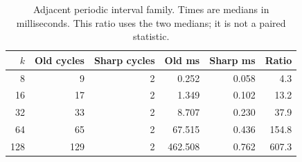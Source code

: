 \begin{table}[htbp]
\centering\small
\setlength{\tabcolsep}{4pt}
\begin{tabular}{@{}rrrrrr@{}}
\toprule
$k$ & Old cycles & Sharp cycles & Old ms & Sharp ms & Ratio\\\midrule
8 & 9 & 2 & 0.252 & 0.058 & 4.3\\
16 & 17 & 2 & 1.349 & 0.102 & 13.2\\
32 & 33 & 2 & 8.707 & 0.230 & 37.9\\
64 & 65 & 2 & 67.515 & 0.436 & 154.8\\
128 & 129 & 2 & 462.508 & 0.762 & 607.3\\
\bottomrule
\end{tabular}
\caption{Adjacent periodic interval family. Times are medians in milliseconds. This ratio uses the two medians; it is not a paired statistic.}
\label{tab:interval}
\end{table}
